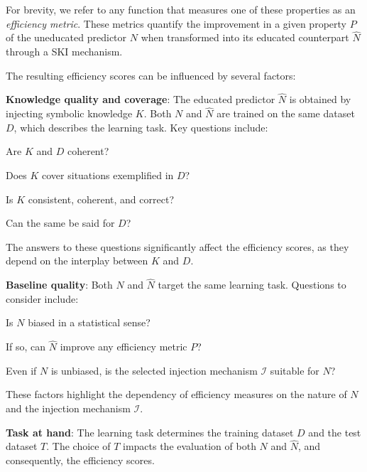 For brevity, we refer to any function that measures one of these properties as an \emph{efficiency metric}.
%
These metrics quantify the improvement in a given property \(P\) of the uneducated predictor \(N\) when transformed into its educated counterpart \(\hat{N}\) through a \gls{SKI} mechanism.

The resulting efficiency scores can be influenced by several factors:
%
\begin{factors}
    \item \textbf{Knowledge quality and coverage}:
    The educated predictor \(\hat{N}\) is obtained by injecting symbolic knowledge \(K\).
    Both \(N\) and \(\hat{N}\) are trained on the same dataset \(D\), which describes the learning task.
    Key questions include:
    \begin{inlinelist}
        \item Are \(K\) and \(D\) coherent?
        \item Does \(K\) cover situations exemplified in \(D\)?
        \item Is \(K\) consistent, coherent, and correct?
        \item Can the same be said for \(D\)?
    \end{inlinelist}
    The answers to these questions significantly affect the efficiency scores, as they depend on the interplay between \(K\) and \(D\).
    \label{itm:knowledge-quality-and-coverage}

    \item \textbf{Baseline quality}:
    Both \(N\) and \(\hat{N}\) target the same learning task.
    Questions to consider include:
    \begin{inlinelist}
        \item Is \(N\) biased in a statistical sense?
        \item If so, can \(\hat{N}\) improve any efficiency metric \(P\)?
        \item Even if \(N\) is unbiased, is the selected injection mechanism \(\mathcal{I}\) suitable for \(N\)?
    \end{inlinelist}
    These factors highlight the dependency of efficiency measures on the nature of \(N\) and the injection mechanism \(\mathcal{I}\).
    \label{itm:baseline-quality}

    \item \textbf{Task at hand}:
    The learning task determines the training dataset \(D\) and the test dataset \(T\).
    The choice of \(T\) impacts the evaluation of both \(N\) and \(\hat{N}\), and consequently, the efficiency scores.
    \label{itm:task-at-hand}
\end{factors}

